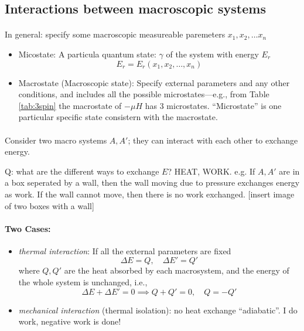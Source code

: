 \documentclass[../main.tex]{subfiles}
\begin{document}
\newpage
{}
\subsection{Interactions between macroscopic systems} 

\paragraph*{} In general: specify some macroscopic measureable paremeters $x_1, x_2, \dots x_n$

\begin{itemize}
    \item Micostate: A particula quantum state: $\gamma$ of the system with energy $E_r$
    \[E_r = E_r(x_1, x_2,\dots, x_n)\]
    \item Macrostate (Macroscopic state): Specify external parameters and any other conditions, and includes all the possible microstates—e.g., from Table \ref{tab:3spin} the macrostate of $-\mu H$ has 3 microstates.
    ``Microstate'' is one particular specific state consistern with the macrostate.
\end{itemize}

\paragraph{} Consider two macro systems $A, A'$; they can interact with each other to exchange energy.

Q: what are the different ways to exchange $E$? HEAT, WORK.
e.g. If $A, A'$ are in a box seperated by a wall, then the wall moving due to pressure exchanges energy as work. If the wall cannot move, then there is no work exchanged.
[insert image of two boxes with a wall]
\paragraph*{Two Cases:}
\begin{itemize}
    \item  \emph{thermal interaction}: If all the external parameters are fixed
    \[\Delta E = Q, \quad \Delta E' = Q'\]
    where $Q, Q'$ are the heat absorbed by each macrosystem, and the energy of the whole system is unchanged, i.e.,
    \[\Delta E + \Delta E' = 0 \implies Q + Q' = 0, \quad Q = -Q'\]
    \item \emph{mechanical interaction} (thermal isolation): no heat exchange ``adiabatic''. I do work, negative work is done!
\end{itemize}
\end{document}

